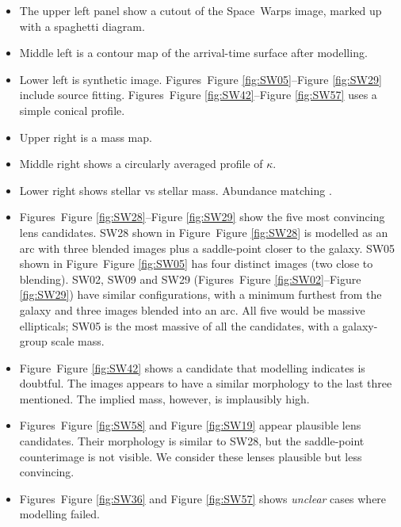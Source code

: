 \documentclass[fleqn,usenatbib]{mnras}
\newcommand{\figref}[1]{Figure \ref{fig:#1}}
\begin{document}
\begin{itemize}

\item The upper left panel show a cutout of the Space~Warps image,
  marked up with a spaghetti diagram.

\item Middle left is a contour map of the arrival-time surface after
  modelling.

\item Lower left is synthetic image.
  Figures~\figref{SW05}--\figref{SW29} include source fitting.
  Figures~\figref{SW42}--\figref{SW57} uses a simple conical
  profile.

\item Upper right is a mass map.

\item Middle right shows a circularly averaged profile of
  $\kappa$.

\item Lower right shows stellar vs stellar mass.  Abundance matching \citep{2010ApJ...710..903M}.

\end{itemize}

\begin{itemize}

\item Figures~\figref{SW28}--\figref{SW29} show the five most
  convincing lens candidates. SW28 shown in Figure~\figref{SW28} is
  modelled as an arc with three blended images plus a saddle-point
  closer to the galaxy.  SW05 shown in Figure~\figref{SW05} has four
  distinct images (two close to blending).  SW02, SW09 and SW29
  (Figures~\figref{SW02}--\figref{SW29}) have similar
  configurations, with a minimum furthest from the galaxy and three
  images blended into an arc.  All five would be massive ellipticals;
  SW05 is the most massive of all the candidates, with a galaxy-group
  scale mass.

\item Figure~\figref{SW42} shows a candidate that modelling indicates
  is doubtful.  The images appears to have a similar morphology to the
  last three mentioned.  The implied mass, however, is implausibly
  high.

\item Figures~\figref{SW58} and \figref{SW19} appear plausible lens
  candidates.  Their morphology is similar to SW28, but the
  saddle-point counterimage is not visible.  We consider these lenses
  plausible but less convincing.

\item Figures~\figref{SW36} and \figref{SW57} shows {\em unclear\/}
  cases where modelling failed.

\end{itemize}
\end{document}
